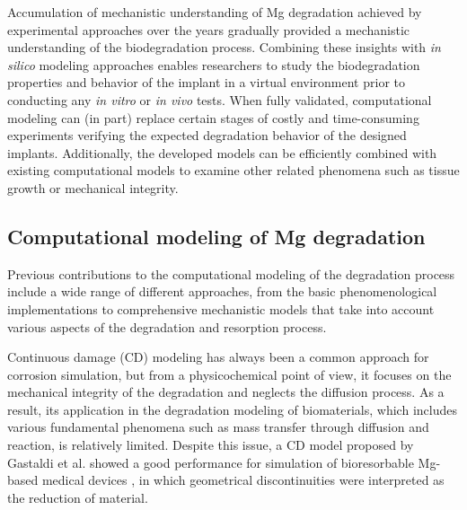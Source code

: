 Accumulation of mechanistic understanding of Mg degradation achieved by experimental approaches over the years gradually provided a mechanistic understanding of the biodegradation process. Combining these insights with \textit{in silico} modeling approaches enables researchers to study the biodegradation properties and behavior of the implant in a virtual environment prior to conducting any \textit{in vitro} or \textit{in vivo} tests. When fully validated, computational modeling can (in part) replace certain stages of costly and time-consuming experiments verifying the expected degradation behavior of the designed implants. Additionally, the developed models can be efficiently combined with existing computational models to examine  other related phenomena such as tissue growth or mechanical integrity.

\subsection{Computational modeling of Mg degradation}

Previous contributions to the computational modeling of the degradation process include a wide range of different approaches, from the basic phenomenological implementations to comprehensive mechanistic models that take into account various aspects of the degradation and resorption process.


Continuous damage (\gls{CD}) modeling has always been a common approach for corrosion simulation, but from a physicochemical point of view, it focuses on the mechanical integrity of the degradation and neglects the diffusion process. As a result, its application in the degradation modeling of biomaterials, which includes various fundamental phenomena such as mass transfer through diffusion and reaction, is relatively limited. Despite this issue, a CD model proposed by Gastaldi et al. showed a good performance for simulation of bioresorbable Mg-based medical devices \cite{Gastaldi2011},
in which geometrical discontinuities were interpreted as the reduction of material.

